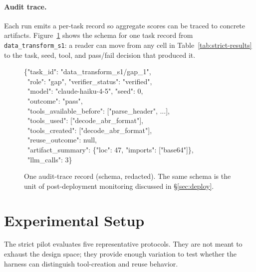 \documentclass[sigconf,anonymous,natbib=false]{acmart}
\begin{document}
\paragraph{Audit trace.}
Each run emits a per-task record so aggregate scores can be traced to concrete artifacts. Figure~\ref{fig:trace-schema} shows the schema for one task record from \texttt{data\_transform\_s1}: a reader can move from any cell in Table~\ref{tab:strict-results} to the task, seed, tool, and pass/fail decision that produced it.

\begin{figure}[t]
\small
\begin{tcolorbox}[colframe=black!70, colback=gray!5, boxrule=0.5pt, fontupper=\ttfamily\footnotesize]
\{"task\_id": "data\_transform\_s1/gap\_1",\\
~"role": "gap", "verifier\_status": "verified",\\
~"model": "claude-haiku-4-5", "seed": 0,\\
~"outcome": "pass",\\
~"tools\_available\_before": ["parse\_header", ...],\\
~"tools\_used": ["decode\_abr\_format"],\\
~"tools\_created": ["decode\_abr\_format"],\\
~"reuse\_outcome": null,\\
~"artifact\_summary": \{"loc": 47, "imports": ["base64"]\},\\
~"llm\_calls": 3\}
\end{tcolorbox}
\caption{One audit-trace record (schema, redacted). The same schema is the unit of post-deployment monitoring discussed in \S\ref{sec:deploy}.}
\label{fig:trace-schema}
\end{figure}

\section{Experimental Setup}

The strict pilot evaluates five representative protocols. They are not meant to exhaust the design space; they provide enough variation to test whether the harness can distinguish tool-creation and reuse behavior.
\end{document}

